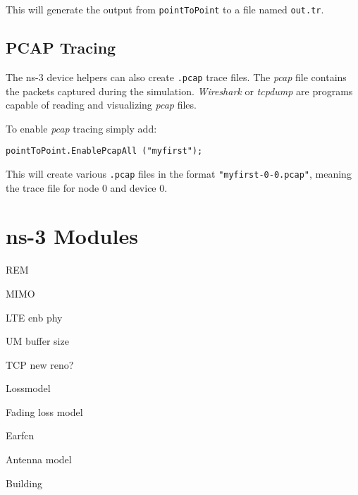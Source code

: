This will generate the output from \texttt{pointToPoint} to a file named \texttt{out.tr}.

\subsection{PCAP Tracing}
The ns-3 device helpers can also create \texttt{.pcap} trace files. The \textit{pcap} file
contains the packets captured during the simulation. \textit{Wireshark} or \textit{tcpdump} 
are programs capable of reading and visualizing \textit{pcap} files.

To enable \textit{pcap} tracing simply add:
\begin{lstlisting}[escapechar=@, language=myC++,caption={PCAP Tracing}, captionpos=b]
  pointToPoint.EnablePcapAll ("myfirst");
\end{lstlisting}

This will create various \texttt{.pcap} files in the format \texttt{"myfirst-0-0.pcap"}, meaning
the trace file for node 0 and device 0.

\section{ns-3 Modules}

REM

MIMO

LTE enb phy

UM buffer size

TCP new reno?

Lossmodel

Fading loss model

Earfcn

Antenna model

Building